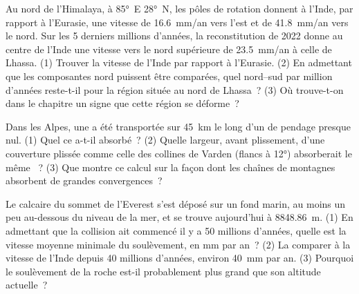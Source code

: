 \begin{exercise}[$\star\star\star$]\label{exo:g12:mountain-building:13}
Au nord de l'Himalaya, à \ang{85}~E \ang{28}~N, les pôles de rotation
donnent à l'Inde, par rapport à l'Eurasie, une vitesse de
\qty{16.6}{mm/an} vers l'est et de \qty{41.8}{mm/an} vers le nord. Sur les
5 derniers millions d'années, la reconstitution de 2022 donne au centre de
l'Inde une vitesse vers le nord supérieure de \qty{23.5}{mm/an} à celle de
Lhassa. (1) Trouver la vitesse de l'Inde par rapport à l'Eurasie.
(2) En admettant que les composantes nord puissent être comparées, quel
 nord--sud par million d'années reste-t-il pour la région
située au nord de Lhassa~? (3) Où trouve-t-on dans le chapitre un signe que
cette région se déforme~?
\end{exercise}

\begin{exercise}[$\star\star\star$]\label{exo:g12:mountain-building:14}
Dans les Alpes, une  a été transportée sur \qty{45}{km}
le long d'un  de pendage presque nul. (1) Quel 
ce  a-t-il absorbé~? (2) Quelle largeur, avant plissement,
d'une couverture plissée comme celle des collines de Varden (flancs à
\ang{12}) absorberait le même ~? (3) Que montre ce calcul
sur la façon dont les chaînes de montagnes absorbent de grandes
convergences~?
\end{exercise}

\begin{exercise}[$\star\star\star$]\label{exo:g12:mountain-building:15}
Le calcaire du sommet de l'Everest s'est déposé sur un fond marin, au moins
un peu au-dessous du niveau de la mer, et se trouve aujourd'hui à
\qty{8848.86}{m}. (1) En admettant que la collision ait commencé il y a 50
millions d'années, quelle est la vitesse moyenne minimale du soulèvement, en
\unit{mm} par an~? (2) La comparer à la vitesse de l'Inde depuis 40 millions
d'années, environ \qty{40}{mm} par an. (3) Pourquoi le soulèvement de la
roche est-il probablement plus grand que son altitude actuelle~?
\end{exercise}


